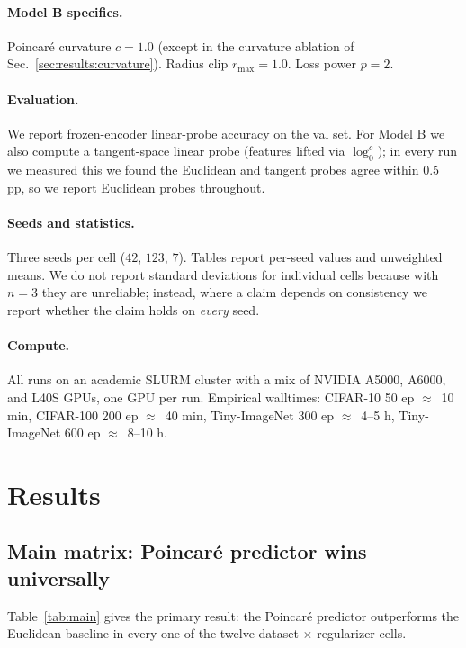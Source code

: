 \documentclass{article}
\begin{document}
\paragraph{Model B specifics.}
Poincar\'{e} curvature $c{=}1.0$ (except in the curvature ablation of Sec.~\ref{sec:results:curvature}). Radius clip $r_{\max}{=}1.0$. Loss power $p{=}2$.

\paragraph{Evaluation.}
We report frozen-encoder linear-probe accuracy on the val set. For Model B we also compute a tangent-space linear probe (features lifted via $\log^c_0$); in every run we measured this we found the Euclidean and tangent probes agree within $0.5$ pp, so we report Euclidean probes throughout.

\paragraph{Seeds and statistics.}
Three seeds per cell ($42$, $123$, $7$). Tables report per-seed values and unweighted means. We do not report standard deviations for individual cells because with $n{=}3$ they are unreliable; instead, where a claim depends on consistency we report whether the claim holds on \emph{every} seed.

\paragraph{Compute.}
All runs on an academic SLURM cluster with a mix of NVIDIA A5000, A6000, and L40S GPUs, one GPU per run. Empirical walltimes: CIFAR-10 50 ep $\approx$~10 min, CIFAR-100 200 ep $\approx$~40 min, Tiny-ImageNet 300 ep $\approx$~4--5 h, Tiny-ImageNet 600 ep $\approx$~8--10 h.

\section{Results}
\label{sec:results}

\subsection{Main matrix: Poincar\'{e} predictor wins universally}
\label{sec:results:main}

Table~\ref{tab:main} gives the primary result: the Poincar\'{e} predictor outperforms the Euclidean baseline in every one of the twelve dataset-$\times$-regularizer cells.
\end{document}
